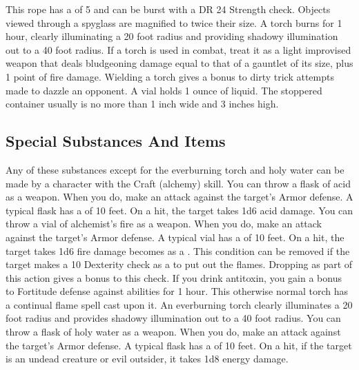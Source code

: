          This rope has a  of 5 and can be burst with a DR 24 Strength check.
         Objects viewed through a spyglass are magnified to twice their size.
         A torch burns for 1 hour, clearly illuminating a 20 foot radius and providing shadowy illumination out to a 40 foot radius. If a torch is used in combat, treat it as a light improvised weapon that deals bludgeoning damage equal to that of a gauntlet of its size, plus 1 point of fire damage. Wielding a torch gives a  bonus to dirty trick attempts made to dazzle an opponent.
         A vial holds 1 ounce of liquid. The stoppered container usually is no more than 1 inch wide and 3 inches high.

    \subsection{Special Substances And Items}
        Any of these substances except for the everburning torch and holy water can be made by a character with the Craft (alchemy) skill.
         You can throw a flask of acid as a weapon.
        When you do, make an attack against the target's Armor defense.
        A typical flask has a  of 10 feet.
        On a hit, the target takes 1d6 acid damage.
         You can throw a vial of alchemist's fire as a weapon.
        When you do, make an attack against the target's Armor defense.
        A typical vial has a  of 10 feet.
        On a hit, the target takes 1d6 fire damage becomes  as a .
        This condition can be removed if the target makes a  10 Dexterity check as a  to put out the flames.
        Dropping  as part of this action gives a  bonus to this check.
         If you drink antitoxin, you gain a  bonus to Fortitude defense against  abilities for 1 hour.
         This otherwise normal torch has a continual flame spell cast upon it. An everburning torch clearly illuminates a 20 foot radius and provides shadowy illumination out to a 40 foot radius.
         You can throw a flask of holy water as a weapon.
        When you do, make an attack against the target's Armor defense.
        A typical flask has a  of 10 feet.
        On a hit, if the target is an undead creature or evil outsider, it takes 1d8 energy damage.
